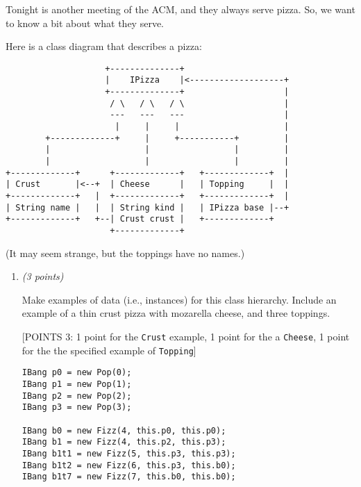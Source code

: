 \documentclass[11pt]{article}
\def\pts#1{\marginpar{\footnotesize \raggedright  \fbox{#1 {\sc Points}}}}
\newcounter{Pctr}
\newenvironment{problem}{\stepcounter{Pctr}%
\begin{description}
\item[\noindent{\bf Problem} \arabic{Pctr}] 
\end{description}}{\relax}
\begin{document}
\vfill\thispagestyle{empty}
\newpage

\pts{34}
\begin{problem}  Tonight is another meeting of the ACM, and they
  always serve pizza. So, we want to know a bit about what they serve.

Here is a class diagram that describes a pizza:

\begin{verbatim}
                    +--------------+
                    |    IPizza    |<-------------------+
                    +--------------+                    |
                     / \   / \   / \                    |
                     ---   ---   ---                    |
                      |     |     |                     |
        +-------------+     |     +-----------+         |
        |                   |                 |         |
        |                   |                 |         |
+-------------+      +-------------+   +-------------+  |
| Crust       |<--+  | Cheese      |   | Topping     |  |
+-------------+   |  +-------------+   +-------------+  |
| String name |   |  | String kind |   | IPizza base |--+ 
+-------------+   +--| Crust crust |   +-------------+
                     +-------------+
\end{verbatim}

(It may seem strange, but the toppings have no names.)


\begin{enumerate}


\newpage
\item {\em{(3 points)}}

 Make examples of data (i.e., instances) for this class
    hierarchy. Include an example of a thin crust pizza with mozarella
    cheese, and three toppings.

\begsol{\vspace{0.5in}}
[POINTS 3: 1 point for the \texttt{Crust} example, 1 point for the a 
\texttt{Cheese}, 1 point for the the specified example of
\texttt{Topping}]  

\begin{verbatim}
IBang p0 = new Pop(0);
IBang p1 = new Pop(1);
IBang p2 = new Pop(2);
IBang p3 = new Pop(3);
	
IBang b0 = new Fizz(4, this.p0, this.p0);
IBang b1 = new Fizz(4, this.p2, this.p3);
IBang b1t1 = new Fizz(5, this.p3, this.p3);
IBang b1t2 = new Fizz(6, this.p3, this.b0);
IBang b1t7 = new Fizz(7, this.b0, this.b0);
\end{verbatim}
\endsol



\end{enumerate}
\end{problem}
\end{document}
